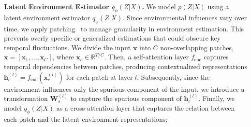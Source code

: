\textbf{Latent Environment Estimator $q_\phi(Z | X)$.} 
We model \( p(Z|X) \) using a latent environment estimator \( q_\phi(Z|X) \). Since environmental influences vary over time, we apply patching~\cite{nie2022time} to manage granularity in environment estimation. This prevents overly specific or generalized estimations that could obscure key temporal fluctuations. We divide the input \( \mathbf{x} \) into \( C \) non-overlapping patches, \( \mathbf{x} = [\mathbf{x}_1, \dots, \mathbf{x}_C] \), where \( \mathbf{x}_c \in \mathbb{R}^{T/C} \). Then, a self-attention layer \( f_\text{enc} \) captures temporal dependencies between patches, producing contextualized representations \( \mathbf{h}^{(l)}_c = f_\text{enc}(\mathbf{x}^{(l)}_c) \) for each patch at layer \( l \). Subsequently, since the environment influences only the spurious component of the input, 
we introduce a transformation $\mathbf{W}_s^{(l)}$ to capture the spurious component of $\mathbf{h}^{(l)}_c$. Finally, we model \( q_\phi(Z | X) \) as a cross-attention layer that captures the relation between each patch and the latent environment representations: 
